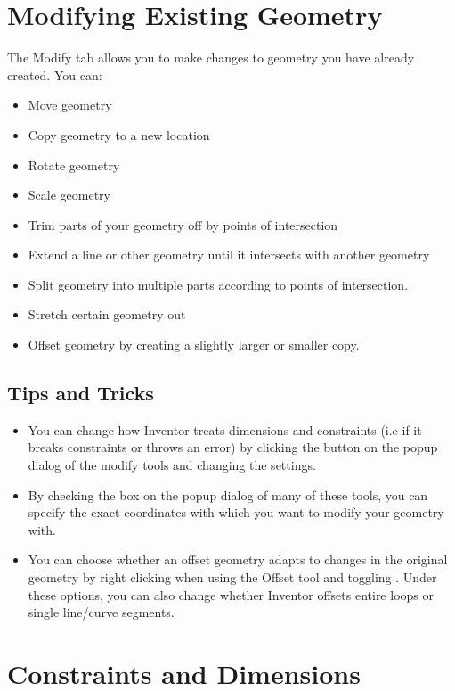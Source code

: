 \section{Modifying Existing Geometry}

The Modify tab allows you to make changes to geometry you have already created. You can:

\begin{itemize}
\item Move geometry
\item Copy geometry to a new location
\item Rotate geometry
\item Scale geometry
\item Trim parts of your geometry off by points of intersection
\item Extend a line or other geometry until it intersects with another geometry
\item Split geometry into multiple parts according to points of intersection.
\item Stretch certain geometry out
\item Offset geometry by creating a slightly larger or smaller copy.
\end{itemize}


\subsection{Tips and Tricks}
\mediumdifficulty
\begin{itemize}
\item You can change how Inventor treats dimensions and constraints (i.e if it breaks constraints or throws an error) by clicking the \appcommand{\(\gg\)} button on the popup dialog of the modify tools and changing the settings.
\item By checking the  box on the popup dialog of many of these tools, you can specify the exact coordinates with which you want to modify your geometry with.
\item You can choose whether an offset geometry adapts to changes in the original geometry by right clicking when using the Offset tool and toggling . Under these options, you can also change whether Inventor offsets entire loops or single line/curve segments.
\end{itemize}

\section{Constraints and Dimensions}
\label{chap:constraints}

